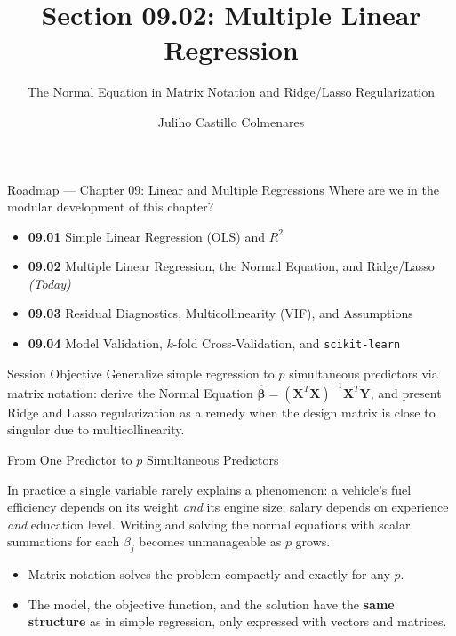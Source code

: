 \documentclass[10pt, aspectratio=169]{beamer}
\title[Multiple Regression]{Section 09.02: Multiple Linear Regression}
\subtitle{The Normal Equation in Matrix Notation and Ridge/Lasso Regularization}
\author[J. Castillo Colmenares]{Juliho Castillo Colmenares}
\institute{Tecnológico de Monterrey}
\date{\vspace{-1.5cm}}
\begin{document}
\begin{frame}[plain]
  \titlepage
\end{frame}

\begin{frame}{Roadmap --- Chapter 09: Linear and Multiple Regressions}
  \footnotesize
  Where are we in the modular development of this chapter? \pause
  \begin{itemize}\itemsep=0.08em
    \item \textbf{09.01} Simple Linear Regression (OLS) and $R^2$ \pause
    \item \textbf{09.02} Multiple Linear Regression, the Normal Equation, and Ridge/Lasso \emph{(Today)} \pause
    \item \textbf{09.03} Residual Diagnostics, Multicollinearity (VIF), and Assumptions \pause
    \item \textbf{09.04} Model Validation, $k$-fold Cross-Validation, and \texttt{scikit-learn}
  \end{itemize}
  \vspace{-0.05cm}
  \begin{block}{Session Objective}
    Generalize simple regression to $p$ simultaneous predictors via matrix notation: derive the Normal Equation $\hat{\boldsymbol\beta}=(\mathbf{X}^T\mathbf{X})^{-1}\mathbf{X}^T\mathbf{Y}$, and present Ridge and Lasso regularization as a remedy when the design matrix is close to singular due to multicollinearity.
  \end{block}
\end{frame}

\begin{frame}{From One Predictor to $p$ Simultaneous Predictors}
  \footnotesize
  \begin{motivacion}
    In practice a single variable rarely explains a phenomenon: a vehicle's fuel efficiency depends on its weight \emph{and} its engine size; salary depends on experience \emph{and} education level. Writing and solving the normal equations with scalar summations for each $\beta_j$ becomes unmanageable as $p$ grows.
  \end{motivacion}

  \vspace{0.15cm}
  \pause
  \begin{itemize}\itemsep=0.1cm
    \item Matrix notation solves the problem compactly and exactly for any $p$. \pause
    \item The model, the objective function, and the solution have the \textbf{same structure} as in simple regression, only expressed with vectors and matrices.
  \end{itemize}
\end{frame}
\end{document}
